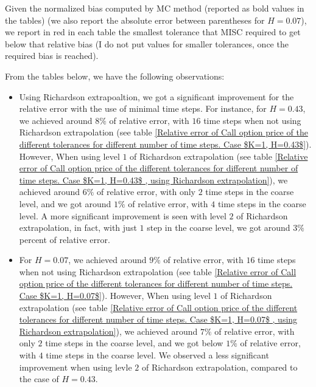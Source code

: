 \documentclass[11pt]{article}
\begin{document}
Given the normalized bias computed by MC method  (reported as bold values in the tables) (we also report the absolute error between parentheses for $H=0.07$), we report in red in each table the smallest tolerance that MISC required to get below that relative bias (I do not put values for smaller tolerances, once the required bias is reached).


From the tables below, we have the following observations:

\begin{itemize}
	\item Using Richardson extrapoaltion, we got a significant improvement for the relative error with the use of minimal time steps. For instance, for $H=0.43$, we achieved around $8\%$ of  relative error, with $16$ time steps when not using Richardson extrapolation (see table \ref{Relative error of Call option price of the different tolerances for different number of time steps. Case $K=1, H=0.43$}). However, When using level $1$ of Richardson extrapolation (see table \ref{Relative error of Call option price of the different tolerances for different number of time steps. Case $K=1, H=0.43$ , using Richardson extrapolation}),  we achieved around $6\%$ of  relative error, with  only $2$ time steps in the coarse level, and we got around  $1\%$ of  relative error, with   $4$ time steps in the coarse level. A more significant improvement is seen with level $2$ of Richardson extrapolation, in fact, with just $1$ step in the coarse level, we got around $3\%$ percent of relative error.
	\item For $H=0.07$, we achieved around $9\%$ of  relative error, with $16$ time steps when not using Richardson extrapolation (see table \ref{Relative error of Call option price of the different tolerances for different number of time steps. Case $K=1, H=0.07$}). However, When using level $1$ of Richardson extrapolation (see table \ref{Relative error of Call option price of the different tolerances for different number of time steps. Case $K=1, H=0.07$ , using Richardson extrapolation}),  we achieved around $7\%$ of  relative error, with  only $2$ time steps in the coarse level, and we got below  $1\%$ of  relative error, with   $4$ time steps in the coarse level. We observed a less significant improvement when using levle $2$ of Richardson extrapolation, compared to the case of $H=0.43$.
	
\end{itemize}
\end{document}
